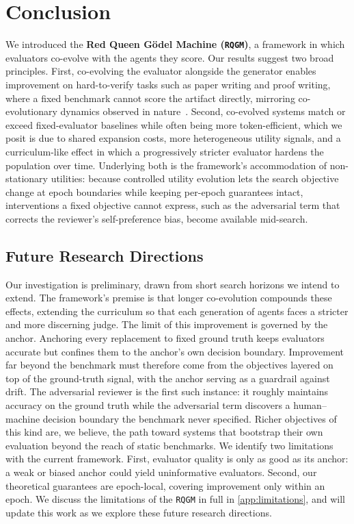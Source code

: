 \documentclass{paper}
\newcommand{\ourmethod}{\texttt{RQGM}\xspace}
\newcommand{\theourmethod}{the \ourmethod}
\begin{document}
\relax





\section{Conclusion}
\label{sec:conclusion}
We introduced the \textbf{Red Queen G\"odel Machine (\ourmethod)}, a framework in which evaluators co-evolve with the agents they score. Our results suggest two broad principles. First, co-evolving the evaluator alongside the generator enables improvement on hard-to-verify tasks such as paper writing and proof writing, where a fixed benchmark cannot score the artifact directly, mirroring co-evolutionary dynamics observed in nature~\citep{van1973new}. Second, co-evolved systems match or exceed fixed-evaluator baselines while often being more token-efficient, which we posit is due to shared expansion costs, more heterogeneous utility signals, and a curriculum-like effect in which a progressively stricter evaluator hardens the population over time. Underlying both is the framework's accommodation of non-stationary utilities: because controlled utility evolution lets the search objective change at epoch boundaries while keeping per-epoch guarantees intact, interventions a fixed objective cannot express, such as the adversarial term that corrects the reviewer's self-preference bias, become available mid-search.

\subsection{Future Research Directions}
\label{sec:future}
Our investigation is preliminary, drawn from short search horizons we intend to extend. The framework's premise is that longer co-evolution compounds these effects, extending the curriculum so that each generation of agents faces a stricter and more discerning judge. The limit of this improvement is governed by the anchor. Anchoring every replacement to fixed ground truth keeps evaluators accurate but confines them to the anchor's own decision boundary. Improvement far beyond the benchmark must therefore come from the objectives layered on top of the ground-truth signal, with the anchor serving as a guardrail against drift. The adversarial reviewer is the first such instance: it roughly maintains accuracy on the ground truth while the adversarial term discovers a human--machine decision boundary the benchmark never specified. Richer objectives of this kind are, we believe, the path toward systems that bootstrap their own evaluation beyond the reach of static benchmarks. We identify two limitations with the current framework. First, evaluator quality is only as good as its anchor: a weak or biased anchor could yield uninformative evaluators. Second, our theoretical guarantees are epoch-local, covering improvement only within an epoch. We discuss the limitations of \theourmethod in full in \cref{app:limitations}, and will update this work as we explore these future research directions.
\end{document}
